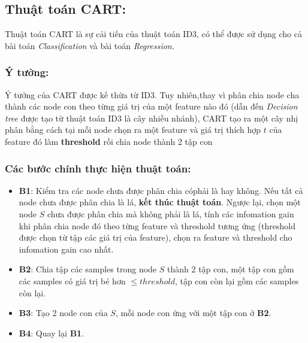\documentclass[12pt, a4paper]{article}
\begin{document}
\subsection{Thuật toán CART:}
Thuật toán CART là sự cải tiến của thuật toán ID3, có thể được sử dụng cho cả bài toán \textit{Classification} và bài toán \textit{Regression}.
\subsubsection{Ý tưởng:}

Ý tưởng của CART được kế thừa từ ID3. Tuy nhiên,thay vì phân chia node cha thành các node con theo từng giá trị của một feature nào đó (dẫn đến \textit{Decision tree} được tạo từ thuật toán ID3 là  cây nhiều nhánh), CART tạo ra một cây nhị phân bằng cách tại mỗi node chọn ra một feature và giá trị thích hợp $t$ của feature đó làm \textbf{threshold} rồi chia node thành 2 tập con



\subsubsection{Các bước chính thực hiện thuật toán:}

\begin{itemize}
    \item \textbf{B1}: Kiểm tra các node chưa được phân chia cóphải là hay không. Nếu tất cả node chưa được phân chia là  lá, \textbf{kết thúc thuật toán}. Ngược lại, chọn một node $S$ chưa được phân chia mà không phải là lá, tính các infomation gain khi phân chia node đó theo từng feature và threshold tương ứng (threshold được chọn từ tập các giá trị của feature), chọn ra feature và threshold cho infomation gain cao nhất.
    \item \textbf{B2}: Chia tập các samples trong node $S$ thành 2 tập con, một tập con gồm các samples có giá trị bé hơn $\leq threshold$, tập con còn lại gồm các samples còn lại.
    \item \textbf{B3}: Tạo 2 node con của $S$, mỗi node con ứng với một tập con ở \textbf{B2}.
    \item \textbf{B4}: Quay lại \textbf{B1}.
\end{itemize}
\end{document}
